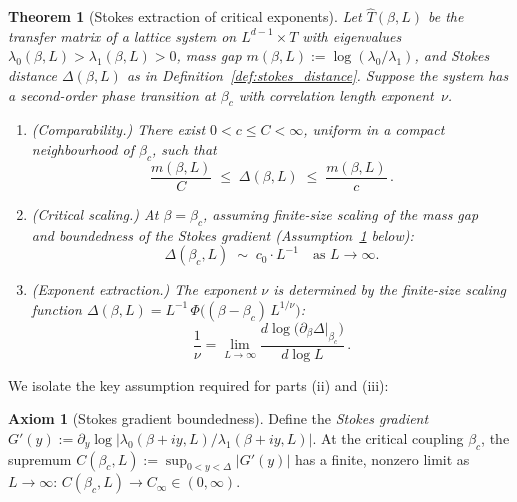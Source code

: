 \documentclass[12pt]{article}
\newtheorem{theorem}{Theorem}[section]
\theoremstyle{definition}
\newtheorem{axiom}{Axiom}
\theoremstyle{remark}
\begin{document}
\begin{theorem}[Stokes extraction of critical exponents]
\label{thm:stokes_exponents}
Let $\hat{T}(\beta, L)$ be the transfer matrix of a lattice system
on $L^{d-1} \times T$ with eigenvalues
$\lambda_0(\beta,L) > \lambda_1(\beta,L) > 0$, mass gap
$m(\beta,L) := \log(\lambda_0/\lambda_1)$, and Stokes distance
$\Delta(\beta,L)$ as in Definition~\ref{def:stokes_distance}.
Suppose the system has a second-order phase transition at $\beta_c$
with correlation length exponent~$\nu$.
\begin{enumerate}[label=(\roman*)]
\item \emph{(Comparability.)} There exist $0 < c \le C < \infty$,
  uniform in a compact neighbourhood of $\beta_c$, such that
  \begin{equation}\label{eq:comparability}
  \frac{m(\beta,L)}{C} \;\le\; \Delta(\beta,L)
  \;\le\; \frac{m(\beta,L)}{c}\,.
  \end{equation}
\item \emph{(Critical scaling.)} At $\beta = \beta_c$, assuming
  finite-size scaling of the mass gap~\cite{Fisher72,Barber83}
  and boundedness of the Stokes gradient
  (Assumption~\ref{assume:gradient} below):
  \begin{equation}\label{eq:delta_scaling}
  \Delta(\beta_c, L) \;\sim\; c_0 \cdot L^{-1}
  \quad\text{as } L \to \infty.
  \end{equation}
\item \emph{(Exponent extraction.)} The exponent $\nu$ is determined
  by the finite-size scaling function
  $\Delta(\beta, L) = L^{-1}\,\Phi\bigl((\beta-\beta_c)\,L^{1/\nu}\bigr)$:
  \begin{equation}\label{eq:nu_extraction}
  \frac{1}{\nu} = \lim_{L\to\infty}
  \frac{d\log\bigl(\partial_\beta\Delta\big|_{\beta_c}\bigr)}{d\log L}\,.
  \end{equation}
\end{enumerate}
\end{theorem}

We isolate the key assumption required for parts (ii) and (iii):

\begin{axiom}[Stokes gradient boundedness]
\label{assume:gradient}
Define the \emph{Stokes gradient}
$G'(y) := \partial_y \log|\lambda_0(\beta+iy,L)/\lambda_1(\beta+iy,L)|$.
At the critical coupling $\beta_c$, the supremum
$C(\beta_c, L) := \sup_{0 < y < \Delta}|G'(y)|$ has a finite,
nonzero limit as $L \to \infty$:
$C(\beta_c, L) \to C_\infty \in (0,\infty)$.
\end{axiom}
\end{document}
